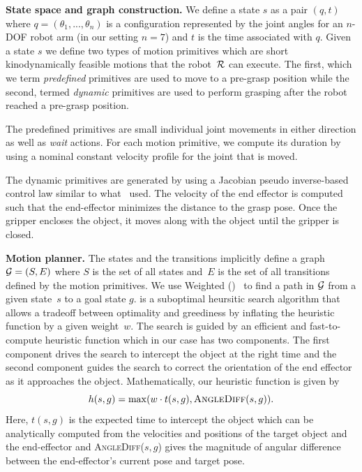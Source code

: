 \documentclass[conference]{IEEEtran}
\begin{document}
\textbf{State space and graph construction.}
We define a state $s$ as a pair $(q,t)$ where $q = (\theta_1, ..., \theta_n)$ is a configuration represented by the joint angles for an $n$-DOF robot arm (in our setting $n=7$) and $t$ is the time associated with $q$.
%
Given a state $s$ we define two types of motion primitives which are short kinodynamically feasible motions that the robot~$\mathcal{R}$ can execute. The first, which we term \emph{predefined} primitives are used to move to a pre-grasp position while the second, termed \emph{dynamic} primitives are used to perform grasping after the robot reached a pre-grasp position.
%

The predefined primitives are small individual joint movements in either direction as well as \emph{wait} actions.
For each motion primitive, we compute its duration by using a nominal constant velocity profile for the  joint that is moved.
%

The dynamic primitives are generated by using a Jacobian pseudo inverse-based control law similar to what~\cite{menon2014motion} used. 
The velocity of the end effector is computed such that the end-effector minimizes the distance to the grasp pose. Once the gripper encloses the object, it moves along with the object until the gripper is closed.

\textbf{Motion planner.}
The states and the transitions implicitly define a graph $\mathcal{G} = (S,E)$ where $S$ is the set of all states and~$E$ is the set of all transitions defined by the motion primitives. We use Weighted \astar (\wastar)~\cite{pohl1970heuristic} to find a path in $\mathcal{G}$ from a given state~$s$ to a goal state $g$. 
\wastar is a suboptimal heursitic search algorithm that allows a tradeoff between optimality and greediness by inflating the heuristic function by a given weight~$w$. 
The search is guided by an efficient and fast-to-compute heuristic function which in our case has two components.
The first component drives the search to intercept the object at the right time and 
the second component guides the search to correct the orientation of the end effector as it approaches the object. 
Mathematically, our heuristic function is given by
$$
 h(s,g) = \max (w \cdot t(s,g), \textsc{AngleDiff}(s,g)).
$$
Here, $t(s,g)$ is the expected time to intercept the object which can be analytically computed from the velocities and positions of the target object and the end-effector and \textsc{AngleDiff}($s,g$) gives the magnitude of angular difference between the end-effector's current pose and target pose.
\end{document}
